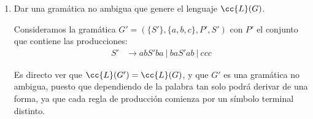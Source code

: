 \documentclass[12pt]{article}
\begin{document}
\begin{ejercicio}
\begin{enumerate}
        Para ello, basta con ver que la palabra $(ab)^2c^3(ba)^2\in \cc{L}(G)$ tiene más de un árbol de derivación. En concreto, los árboles de derivación que se pueden obtener son los que se muestran en la Figura~\ref{fig:arboles}.
        \begin{figure}
            \centering
            \caption{Árboles de derivación para $(ab)^2c^3(ba)^2$.}
            \label{fig:arboles}
        \end{figure}
        \item Dar una gramática no ambigua que genere el lenguaje $\cc{L}(G)$.
        
        Consideramos la gramática $G'=(\{S'\},\{a,b,c\},P',S')$ con $P'$ el conjunto que contiene las producciones:
        \begin{equation*}
            \begin{aligned}
                S' &\to abS'ba\ |\ baS'ab\ |\ ccc
            \end{aligned}
        \end{equation*}

        Es directo ver que $\cc{L}(G')=\cc{L}(G)$, y que $G'$ es una gramática no ambigua, puesto que dependiendo de la palabra tan solo podrá derivar de una forma, ya que cada regla de producción comienza por un símbolo terminal distinto.
    \end{enumerate}
\end{ejercicio}
\end{document}

